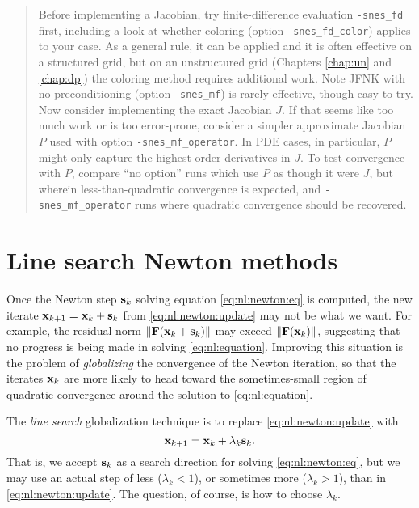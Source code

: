 \begin{quote}
Before implementing a Jacobian, try finite-difference evaluation \texttt{-snes\_fd} first, including a look at whether coloring (option \texttt{-snes\_fd\_color}) applies to your case.  As a general rule, it can be applied and it is often effective on a structured grid, but on an unstructured grid (Chapters \ref{chap:un} and \ref{chap:dp}) the coloring method requires additional work.  Note JFNK with no preconditioning (option \texttt{-snes\_mf}) is rarely effective, though easy to try.  Now consider implementing the exact Jacobian $J$.  If that seems like too much work or is too error-prone, consider a simpler approximate Jacobian $P$ used with option \texttt{-snes\_mf\_operator}.  In PDE cases, in particular, $P$ might only capture the highest-order derivatives in $J$.  To test convergence with $P$, compare ``no option'' runs which use $P$ as though it were $J$, but wherein less-than-quadratic convergence is expected, and \texttt{-snes\_mf\_operator} runs where quadratic convergence should be recovered.
\end{quote}


\section{Line search Newton methods} \label{sec:linesearch}

Once the Newton step $\mathbf{s}_k$ solving equation \eqref{eq:nl:newton:eq} is computed, the new iterate $\mathbf{x}_{k+1} = \mathbf{x}_k + \mathbf{s}_k$ from \eqref{eq:nl:newton:update} may not be what we want.  For example, the residual norm $\|\mathbf{F}(\mathbf{x}_k + \mathbf{s}_k)\|$ may exceed $\|\mathbf{F}(\mathbf{x}_{k})\|$, suggesting that no progress is being made in solving \eqref{eq:nl:equation}.  Improving this situation is the problem of \emph{globalizing} the convergence of the Newton iteration, so that the iterates $\mathbf{x}_k$ are more likely to head toward the sometimes-small region of quadratic convergence around the solution to \eqref{eq:nl:equation}.

The \emph{line search} globalization technique \citep{DennisSchnabel1983} is to replace \eqref{eq:nl:newton:update} with
\begin{equation}
\mathbf{x}_{k+1} = \mathbf{x}_k + \lambda_k \mathbf{s}_k.  \label{eq:nl:linesearchupdate}
\end{equation}
That is, we accept $\mathbf{s}_k$ as a search direction for solving \eqref{eq:nl:newton:eq}, but we may use an actual step of less ($\lambda_k < 1$), or sometimes more ($\lambda_k > 1$), than in \eqref{eq:nl:newton:update}.  The question, of course, is how to choose $\lambda_k$.

